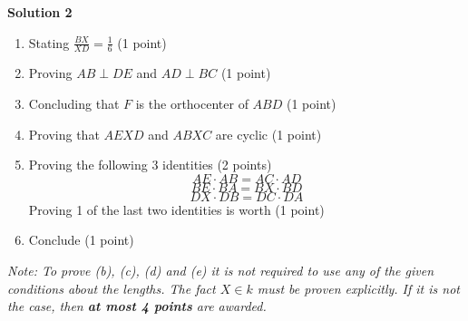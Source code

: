 {\textbf{Solution 2}
	
\begin{enumerate}
		\item Stating $\frac{BX}{XD} =\frac{1}{6}$ \dotfill (1 point)
		\item Proving $AB \perp DE$ and $AD \perp BC$ \dotfill (1 point)
		\item Concluding that $F$ is the orthocenter of $ABD$ \dotfill (1 point)
		\item Proving that $AEXD$ and $ABXC$ are cyclic \dotfill (1 point)
		\item Proving the following 3 identities \dotfill (2 points)
   		\[ AE\cdot AB=AC\cdot AD\]
		\[ BE\cdot BA=BX\cdot BD\]
		\[ DX\cdot DB=DC\cdot DA\]
		Proving 1 of the last two identities is worth \dotfill (1 point)
		\item Conclude \dotfill (1 point)
	\end{enumerate}
	\emph{Note: To prove (b), (c), (d) and (e) it is not required to use any of the given conditions about the lengths. The fact $X \in k$ must be proven explicitly. If it is not the case, then \textbf{at most 4 points} are awarded.}
}